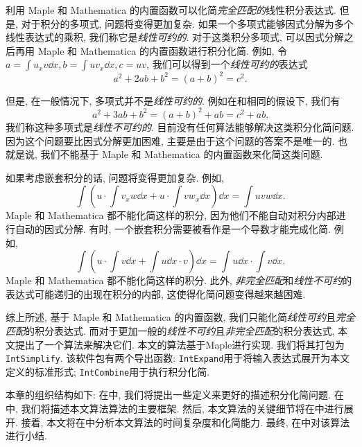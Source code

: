 利用 Maple 和 Mathematica 的内置函数可以化简\emph{完全匹配的}线性积分表达式. 但是, 对于积分的多项式, 问题将变得更加复杂. 如果一个多项式能够因式分解为多个线性表达式的乘积, 我们称它是\emph{线性可约的}. 对于这类积分多项式, 可以因式分解之后再用 Maple 和 Mathematica 的内置函数进行积分化简. 例如, 令$a=\int{u_x v \dd x},b=\int{u v_x \dd x},c=uv$, 我们可以得到一个\emph{线性可约的}表达式
\begin{equation}
a^2+2ab+b^2=(a+b)^2=c^2.
\label{liner_reducible}
\end{equation}

但是, 在一般情况下, 多项式并不是\emph{线性可约的}. 例如在和相同的假设下, 我们有
\begin{equation}
a^2+3ab+b^2=(a+b)^2+ab=c^2+ab.
\label{non_linear_reducible}
\end{equation} 
我们称这种多项式是\emph{线性不可约的}. 目前没有任何算法能够解决这类积分化简问题. 因为这个问题要比因式分解更加困难, 主要是由于这个问题的答案不是唯一的. 也就是说, 我们不能基于 Maple 和 Mathematica 的内置函数来化简这类问题. 

如果考虑嵌套积分的话, 问题将变得更加复杂. 例如, 
\begin{equation}
\int\!{\left(u\cdot\int\!{v_xw\dd x}+u\cdot\int\!{vw_x\dd x}\right)\dd x}=\int\!{uvw\dd x}.
\label{nested_integral}
\end{equation}
Maple 和 Mathematica 都不能化简这样的积分, 因为他们不能自动对积分内部进行自动的因式分解. 有时, 一个嵌套积分需要被看作是一个导数才能完成化简. 例如,
\begin{equation}
\int\!{\left(u\cdot\int\!{v\dd x}+\int\!{u\dd x}\cdot v\right)\dd x}=\int\!{u\dd x}\cdot\int\!{v\dd x}.
\label{integral_as_differential}
\end{equation}
Maple 和 Mathematica 都不能化简这样的积分. 此外, \emph{非完全匹配}和\emph{线性不可约}的表达式可能递归的出现在积分的内部, 这使得化简问题变得越来越困难.

综上所述, 基于 Maple 和 Mathematica 的内置函数, 我们只能化简\emph{线性可约}且\emph{完全匹配}的积分表达式. 而对于更加一般的\emph{线性不可约}且\emph{非完全匹配}的积分表达式, 本文提出了一个算法来解决它们. 本文的算法基于Maple进行实现. 我们将其打包为\texttt{IntSimplify}. 该软件包有两个导出函数: \texttt{IntExpand}用于将输入表达式展开为本文定义的标准形式; \texttt{IntCombine}用于执行积分化简. 

本章的组织结构如下: 在中, 我们将提出一些定义来更好的描述积分化简问题. 在中, 我们将描述本文算法算法的主要框架. 然后, 本文算法的关键细节将在中进行展开. 接着, 本文将在中分析本文算法的时间复杂度和化简能力. 最终, 在中对该算法进行小结.

